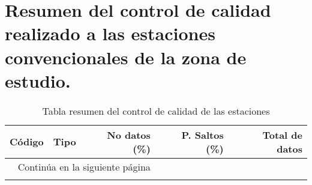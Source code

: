 \clearpage

\chapter{Resumen del control de calidad realizado a las estaciones convencionales de la zona de estudio.}
\label{anexo:resumen_control_calidad_est_con2}


\begin{longtable}{llrrr}
\caption{Tabla resumen del control de calidad de las estaciones}
\label{tab:control_cal_conv}\\
\hline
   Código &               Tipo &  No datos (\%) &  P. Saltos (\%) &  Total de datos \\
\midrule
\endhead
\midrule
\multicolumn{3}{r}{{Continúa en la siguiente página}} \\
\midrule
\endfoot


\end{longtable}
